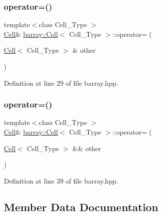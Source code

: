 \subsubsection{\texorpdfstring{operator=()}{operator=()}\hspace{0.1cm}{\footnotesize\ttfamily [1/2]}}
{\footnotesize\ttfamily template$<$class Cell\+\_\+\+Type $>$ \\
\hyperlink{classbarray_1_1_cell}{Cell}\& \hyperlink{classbarray_1_1_cell}{barray\+::\+Cell}$<$ Cell\+\_\+\+Type $>$\+::operator= (\begin{DoxyParamCaption}\item[{\hyperlink{classbarray_1_1_cell}{Cell}$<$ Cell\+\_\+\+Type $>$ \&}]{other }\end{DoxyParamCaption})\hspace{0.3cm}{\ttfamily [inline]}}



Definition at line 29 of file barray.\+hpp.

\mbox{\label{classbarray_1_1_cell_aefdd2fc72a23ea6550cfee17746ed174}} 
\subsubsection{\texorpdfstring{operator=()}{operator=()}\hspace{0.1cm}{\footnotesize\ttfamily [2/2]}}
{\footnotesize\ttfamily template$<$class Cell\+\_\+\+Type $>$ \\
\hyperlink{classbarray_1_1_cell}{Cell}\& \hyperlink{classbarray_1_1_cell}{barray\+::\+Cell}$<$ Cell\+\_\+\+Type $>$\+::operator= (\begin{DoxyParamCaption}\item[{\hyperlink{classbarray_1_1_cell}{Cell}$<$ Cell\+\_\+\+Type $>$ \&\&}]{other }\end{DoxyParamCaption})\hspace{0.3cm}{\ttfamily [inline]}}



Definition at line 39 of file barray.\+hpp.



\subsection{Member Data Documentation}
\mbox{\label{classbarray_1_1_cell_a186e7a58d801c8ff5837321937902f07}} 
